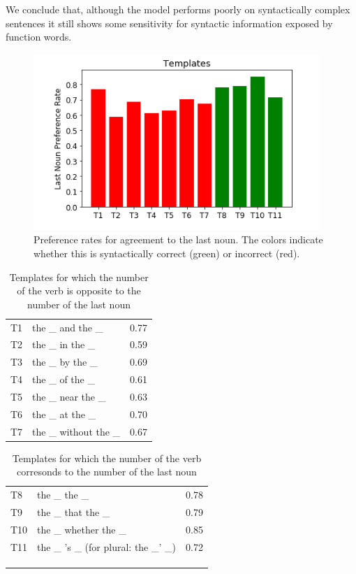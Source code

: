 We conclude that, although the model 
performs poorly on syntactically complex sentences it
still shows some sensitivity for syntactic 
information exposed by function words. 


\begin{figure}
    \centering
\includegraphics[scale=0.5]{screenshot-syntactic-templates} 
\caption{Preference rates for agreement to the last noun.
The colors indicate whether this is syntactically correct (green)
or incorrect (red).
}
\label{fig:last_noun_rates}
\end{figure}



\begin{table}[t] 
\parbox{\linewidth}{
\centering
\begin{tabular}{ l l r }
  T1    & the \_ and the \_     &  0.77 \\
  T2    & the \_ in the \_      &  0.59 \\
  T3    & the \_ by the \_      &  0.69 \\
  T4    & the \_ of the \_      &  0.61 \\
  T5    & the \_ near the \_    &  0.63\\
  T6    & the \_ at the \_      &  0.70\\
  T7    & the \_ without the \_ & 0.67  \\
\end{tabular}
\caption{Templates for which the number of the verb 
is opposite to the number of the last noun} 
\label{tab:attractor_templates}
}
\end{table}


\begin{table}[t] 
\parbox{\linewidth}{
\centering
\begin{tabular}{ l l r }
  T8    & the \_ the \_         &  0.78\\
  T9    & the \_ that the \_    &  0.79\\
  T10   & the \_ whether the \_ &  0.85\\
  T11   & the \_ 's \_ (for plural: the \_' \_)          &  0.72 \\
\\
\\
\\
\end{tabular}
\caption{Templates for which the number of the verb 
corresonds to the number of the last noun} 
\label{tab:lastnoun_templates}
}
\end{table}



